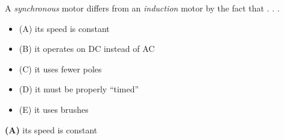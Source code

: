 

A {\it synchronous} motor differs from an {\it induction} motor by the fact that . . .

\begin{itemize}
\item{(A)} its speed is constant
\vskip 5pt 
\item{(B)} it operates on DC instead of AC
\vskip 5pt 
\item{(C)} it uses fewer poles
\vskip 5pt 
\item{(D)} it must be properly ``timed'' 
\vskip 5pt 
\item{(E)} it uses brushes
\end{itemize}







{\bf (A)} its speed is constant











